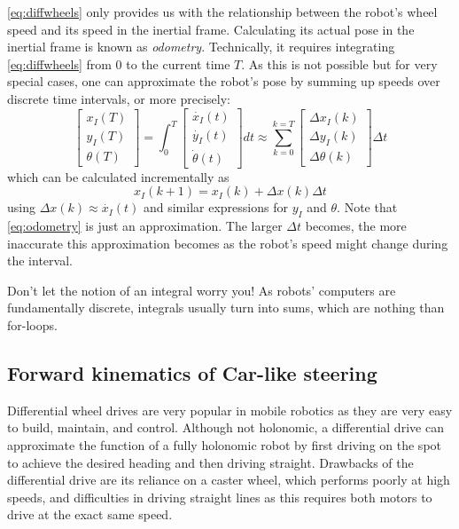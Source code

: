 \cref{eq:diffwheels} only provides us with the relationship between the robot's wheel speed and its speed in the inertial frame.
Calculating its actual pose in the inertial frame is known as \emph{odometry}. Technically, it requires integrating \cref{eq:diffwheels} from 0 to the current time $T$.
As this is not possible but for very special cases, one can approximate the robot's pose by summing up speeds over discrete time intervals, or more precisely:
\begin{equation}
\left[\begin{array}{c} {x_I}(T)\\{y_I}(T)\\{\theta}(T)\end{array}\right]=
\int_0^T \left[\begin{array}{c} \dot{x_I}(t)\\\dot{y_I}(t)\\\dot{\theta}(t)\end{array}\right] dt \approx
\sum_{k=0}^{k=T}\left[\begin{array}{c} \Delta{x_I}(k)\\\Delta{y_I}(k)\\\Delta{\theta}(k)\end{array}\right]\Delta t
\end{equation} which can be calculated incrementally as
\begin{equation}\label{eq:odometry}
x_I(k+1)=x_I(k)+\Delta x (k) \Delta t
\end{equation}
using $\Delta x(k) \approx \dot{x_I}(t)$ and similar expressions for $y_I$ and $\theta$. Note that \cref{eq:odometry} is just an approximation. The larger $\Delta t$ becomes, the more inaccurate this approximation becomes as the robot's speed might change during the interval.

\begin{framed}
\noindent Don't let the notion of an integral worry you! As robots' computers are fundamentally discrete, integrals usually turn into sums, which are nothing than for-loops.
\end{framed}

\subsection{Forward kinematics of Car-like steering}\label{sec:kinematics:carsteering}

Differential wheel drives are very popular in mobile robotics as they are very easy to build, maintain, and control.
Although not holonomic, a differential drive can approximate the function of a fully holonomic robot by first driving on the spot to achieve the desired heading and then driving straight.
Drawbacks of the differential drive are its reliance on a caster wheel, which performs poorly at high speeds, and difficulties in driving straight lines as this requires both motors to drive at the exact same speed.

